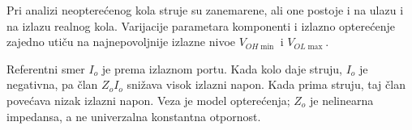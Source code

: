 Pri analizi neopterećenog kola struje su zanemarene, ali one postoje i na ulazu i na izlazu realnog kola. Varijacije parametara komponenti i izlazno opterećenje zajedno utiču na najnepovoljnije izlazne nivoe $V_{OH\min}$ i $V_{OL\max}$.

Referentni smer $I_o$ je prema izlaznom portu. Kada kolo daje struju, $I_o$ je negativna, pa član $Z_oI_o$ snižava visok izlazni napon. Kada prima struju, taj član povećava nizak izlazni napon. Veza je model opterećenja; $Z_o$ je nelinearna impedansa, a ne univerzalna konstantna otpornost.
